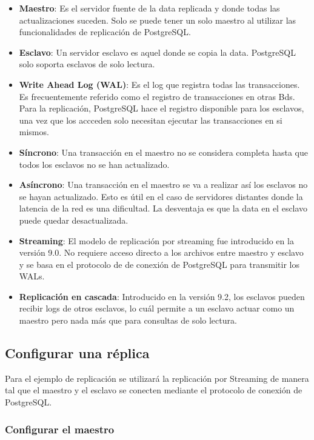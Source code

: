 \begin{itemize}
\item \textbf{Maestro}: Es el servidor fuente de la data replicada y donde todas las actualizaciones suceden. Solo se puede tener un solo maestro al utilizar las funcionalidades de replicación de PostgreSQL.
\item \textbf{Esclavo}: Un servidor esclavo es aquel donde se copia la data. PostgreSQL solo soporta esclavos de solo lectura.
\item \textbf{Write Ahead Log (WAL)}: Es el log que registra todas las transacciones. Es frecuentemente referido como el registro de transacciones en otras Bds. Para la replicación, PostgreSQL hace el registro disponible para los esclavos, una vez que los accceden solo necesitan ejecutar las transacciones en si mismos.
\item \textbf{Síncrono}: Una transacción en el maestro no se considera completa hasta que todos los esclavos no se han actualizado.
\item \textbf{Asíncrono}: Una transacción en el maestro se va a realizar así los esclavos no se hayan actualizado. Esto es útil en el caso de servidores distantes donde la latencia de la red es una dificultad. La desventaja es que la data en el esclavo puede quedar desactualizada.
\item \textbf{Streaming}: El modelo de replicación por streaming fue introducido en la versión 9.0. No requiere acceso directo a los archivos entre maestro y esclavo y se basa en el protocolo de de conexión de PostgreSQL para transmitir los WALs.
\item \textbf{Replicación en cascada}: Introducido en la versión 9.2, los esclavos pueden recibir logs de otros esclavos, lo cuál permite a un esclavo actuar como un maestro pero nada más que para consultas de solo lectura.
\end{itemize}

\subsection{Configurar una réplica}

Para el ejemplo de replicación se utilizará la replicación por Streaming de manera tal que el maestro y el esclavo se conecten mediante el protocolo de conexión de PostgreSQL.

\subsubsection{Configurar el maestro}

